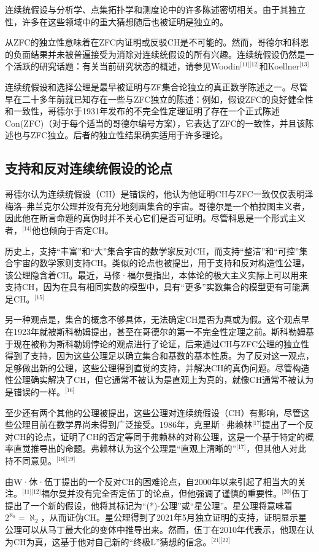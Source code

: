 连续统假设与分析学、点集拓扑学和测度论中的许多陈述密切相关。由于其独立性，许多在这些领域中的重大猜想随后也被证明是独立的。

从ZFC的独立性意味着在ZFC内证明或反驳CH是不可能的。然而，哥德尔和科恩的负面结果并未被普遍接受为消除对连续统假设的所有兴趣。连续统假设仍然是一个活跃的研究话题：有关当前研究状态的概述，请参见Woodin\(^\text{[11][12]}\)和Koellner\(^\text{[13]}\)

连续统假设和选择公理是最早被证明与ZF集合论独立的真正数学陈述之一。尽管早在二十多年前就已知存在一些与ZFC独立的陈述：例如，假设ZFC的良好健全性和一致性，哥德尔于1931年发布的不完全性定理证明了存在一个正式陈述Con(ZFC)（对于每个适当的哥德尔编号方案），它表达了ZFC的一致性，并且该陈述也与ZFC独立。后者的独立性结果确实适用于许多理论。
\subsection{支持和反对连续统假设的论点}  
哥德尔认为连续统假设（CH）是错误的，他认为他证明CH与ZFC一致仅仅表明泽梅洛–弗兰克尔公理并没有充分地刻画集合的宇宙。哥德尔是一个柏拉图主义者，因此他在断言命题的真伪时并不关心它们是否可证明。尽管科恩是一个形式主义者，\(^\text{[14]}\)他也倾向于否定CH。

历史上，支持“丰富”和“大”集合宇宙的数学家反对CH，而支持“整洁”和“可控”集合宇宙的数学家则支持CH。类似的论点也被提出，用于支持和反对构造性公理，该公理隐含着CH。最近，马修·福尔曼指出，本体论的极大主义实际上可以用来支持CH，因为在具有相同实数的模型中，具有“更多”实数集合的模型更有可能满足CH。\(^\text{[15]}\)

另一种观点是，集合的概念不够具体，无法确定CH是否为真或为假。这个观点早在1923年就被斯科勒姆提出，甚至在哥德尔的第一不完全性定理之前。斯科勒姆基于现在被称为斯科勒姆悖论的观点进行了论证，后来通过CH与ZFC公理的独立性得到了支持，因为这些公理足以确立集合和基数的基本性质。为了反对这一观点，足够做出新的公理，这些公理得到直觉的支持，并解决CH的真伪问题。尽管构造性公理确实解决了CH，但它通常不被认为是直观上为真的，就像CH通常不被认为是错误的一样。\(^\text{[16]}\)

至少还有两个其他的公理被提出，这些公理对连续统假设（CH）有影响，尽管这些公理目前在数学界尚未得到广泛接受。1986年，克里斯·弗赖林\(^\text{[17]}\)提出了一个反对CH的论点，证明了CH的否定等同于弗赖林的对称公理，这是一个基于特定的概率直觉推导出的命题。弗赖林认为这个公理是“直观上清晰的”\(^\text{[17]}\)，但其他人对此持不同意见。\(^\text{[18][19]}\)

由W·休·伍丁提出的一个反对CH的困难论点，自2000年以来引起了相当大的关注。\(^\text{[11][12]}\)福尔曼并没有完全否定伍丁的论点，但他强调了谨慎的重要性。\(^\text{[20]}\)伍丁提出了一个新的假设，他将其标记为“(*)-公理”或“星公理”。星公理将意味着\( 2^{\aleph_0} = \aleph_2 \)，从而证伪CH。星公理得到了2021年5月独立证明的支持，证明显示星公理可以从马丁最大化的变体中推导出来。然而，伍丁在2010年代表示，他现在认为CH为真，这基于他对自己新的“终极L”猜想的信念。\(^\text{[21][22]}\)


